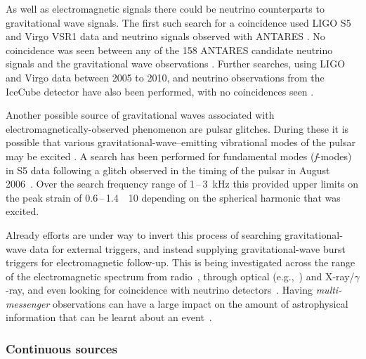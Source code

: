 As well as electromagnetic signals there could be neutrino counterparts to gravitational wave signals. The 
first such search for a coincidence used LIGO S5 and Virgo VSR1 data and neutrino signals observed with 
ANTARES \cite{2011NIMPA.656...11A}. No coincidence was seen between any of the 158 ANTARES candidate neutrino 
signals and the gravitational wave observations \cite{2013JCAP...06..008A}. Further searches, using LIGO and 
Virgo data between 2005 to 2010, and neutrino observations from the IceCube detector 
\cite{2014PhRvD..90j2002A} have also been performed, with no coincidences seen \cite{2014PhRvD..90j2002A}.

Another possible source of gravitational waves associated with electromagnetically-observed phenomenon are 
pulsar glitches. During these it is possible that various gravitational-wave--emitting vibrational modes of 
the pulsar may be excited \cite{1998MNRAS.299.1059A}. A search has been performed for fundamental modes 
(\textit{f}-modes) in S5 data following a glitch observed in the timing of the  pulsar in 
August 2006~\cite{Abadie:2010a}. Over the search frequency range of 1\,--\,3~kHz this provided upper limits 
on the peak strain of 0.6\,--\,1.4~\texttimes~10 depending on the spherical harmonic that was 
excited.

Already efforts are under way to invert this process of searching gravitational-wave data for external 
triggers, and instead supplying gravitational-wave burst triggers for electromagnetic follow-up. This is 
being investigated across the range of the electromagnetic spectrum from radio~\cite{Predoi:2010}, through
optical (e.g.,~\cite{Kanner:2008, Coward:2010}) and X-ray/$\gamma$-ray, and even looking for coincidence with 
neutrino detectors~\cite{Aso:2008, Pradier:2010, Chassande:2010}. Having \textit{multi-messenger} 
observations can have a large impact on the amount of astrophysical information that can be learnt about
an event~\cite{Phinney:2009}.

\subsubsection{Continuous sources}

